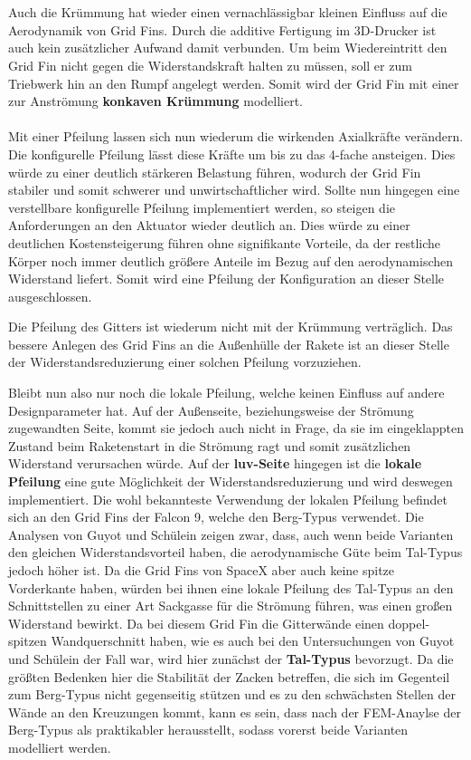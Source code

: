 \\~\\
Auch die Krümmung hat wieder einen vernachlässigbar kleinen Einfluss auf die Aerodynamik von Grid Fins. Durch die additive Fertigung im 3D-Drucker ist auch kein zusätzlicher Aufwand damit verbunden. Um beim Wiedereintritt den Grid Fin nicht gegen die Widerstandskraft halten zu müssen, soll er zum Triebwerk hin an den Rumpf angelegt werden. Somit wird der Grid Fin mit einer zur Anströmung \textbf{konkaven Krümmung} modelliert.
\\~\\
Mit einer Pfeilung lassen sich nun wiederum die wirkenden Axialkräfte verändern. Die konfigurelle Pfeilung lässt diese Kräfte um bis zu das 4-fache ansteigen. Dies würde zu einer deutlich stärkeren Belastung führen, wodurch der Grid Fin stabiler und somit schwerer und unwirtschaftlicher wird. Sollte nun hingegen eine verstellbare konfigurelle Pfeilung implementiert werden, so steigen die Anforderungen an den Aktuator wieder deutlich an. Dies würde zu einer deutlichen Kostensteigerung führen ohne signifikante Vorteile, da der restliche Körper noch immer deutlich größere Anteile im Bezug auf den aerodynamischen Widerstand liefert. Somit wird eine Pfeilung der Konfiguration an dieser Stelle ausgeschlossen.

Die Pfeilung des Gitters ist wiederum nicht mit der Krümmung verträglich. Das bessere Anlegen des Grid Fins an die Außenhülle der Rakete ist an dieser Stelle der Widerstandsreduzierung einer solchen Pfeilung vorzuziehen.

Bleibt nun also nur noch die lokale Pfeilung, welche keinen Einfluss auf andere Designparameter hat. Auf der Außenseite, beziehungsweise der Strömung zugewandten Seite, kommt sie jedoch auch nicht in Frage, da sie im eingeklappten Zustand beim Raketenstart in die Strömung ragt und somit zusätzlichen Widerstand verursachen würde. Auf der \textbf{luv-Seite} hingegen ist die \textbf{lokale Pfeilung} eine gute Möglichkeit der Widerstandsreduzierung und wird deswegen implementiert. Die wohl bekannteste Verwendung der lokalen Pfeilung befindet sich an den Grid Fins der Falcon 9, welche den Berg-Typus verwendet. Die Analysen von Guyot und Schülein \cite{PeakValley} zeigen zwar, dass, auch wenn beide Varianten den gleichen Widerstandsvorteil haben, die aerodynamische Güte beim Tal-Typus jedoch höher ist. Da die Grid Fins von SpaceX aber auch keine spitze Vorderkante haben, würden bei ihnen eine lokale Pfeilung des Tal-Typus an den Schnittstellen zu einer Art Sackgasse für die Strömung führen, was einen großen Widerstand bewirkt. Da bei diesem Grid Fin die Gitterwände einen doppel-spitzen Wandquerschnitt haben, wie es auch bei den Untersuchungen von Guyot und Schülein der Fall war, wird hier zunächst der \textbf{Tal-Typus} bevorzugt. Da die größten Bedenken hier die Stabilität der Zacken betreffen, die sich im Gegenteil zum Berg-Typus nicht gegenseitig stützen und es zu den schwächsten Stellen der Wände an den Kreuzungen kommt, kann es sein, dass nach der FEM-Anaylse der Berg-Typus als praktikabler herausstellt, sodass vorerst beide Varianten modelliert werden.
